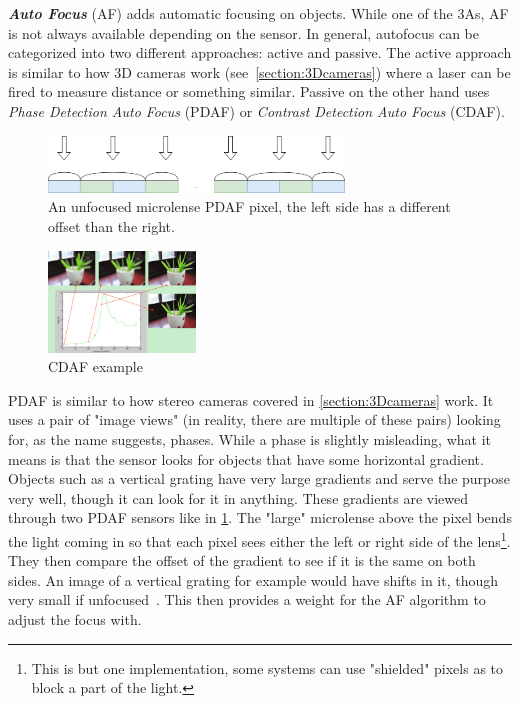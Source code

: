 \textit{\textbf{Auto Focus}} (AF)  adds automatic focusing on objects. While
one of the 3As, AF is not always available depending on the sensor. In general,
autofocus can be categorized into two different approaches: active and passive.
The active approach is similar to how 3D cameras work (see~\cref{section:3Dcameras})
where a laser can be fired to measure distance or something similar. Passive on
the other hand uses \textit{Phase Detection Auto Focus} (PDAF) or
\textit{Contrast Detection Auto Focus} (CDAF).

\begin{figure}
    \centering
        \includegraphics[width=0.7\textwidth]{figures/pdaf_sensor.png}
        \caption{An unfocused microlense PDAF pixel, the left side has a
        different offset than the right.}
        \label{fig:pdaf}
\end{figure}

\begin{figure}
    \begin{center}
        \includegraphics[width=0.35\textwidth]{figures/cdaf.png}
    \end{center}
    \caption{CDAF example~\cite{xu2011robust}}\label{fig:cdaf}
\end{figure}
PDAF is similar to how stereo cameras covered in \cref{section:3Dcameras}
work. It uses a pair of "image views" (in reality, there are multiple of these pairs)
looking for, as the name suggests, phases. While a phase is slightly
misleading, what it means is that the sensor looks for objects that have some
horizontal gradient. Objects such as a vertical grating have very large
gradients and serve the purpose very well, though it can look for it in
anything. These gradients are viewed through two PDAF sensors like in
\cref{fig:pdaf}. The "large" microlense above the pixel bends the light coming
in so that each pixel sees either the left or right side of the
lens\footnote{This is but one implementation, some systems can use "shielded"
pixels as to block a part of the light.}. They then compare the offset of the
gradient to see if it is the same on both sides. An image of a vertical
grating for example would have shifts in it, though very small if unfocused~\cite{pdafPatent}.
This then provides a weight for the AF algorithm to adjust the focus with.

